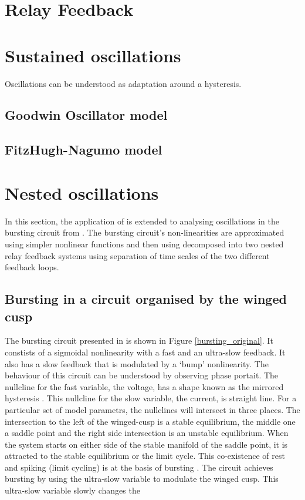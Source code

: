 \documentclass[a4paper, 12pt]{article}
\begin{document}
\section{Relay Feedback}


\section{Sustained oscillations}
Oscillations can be understood as adaptation around a hysteresis. 

\subsection{Goodwin Oscillator model}
\subsection{FitzHugh-Nagumo model}
\section{Nested oscillations}
In this section, the application of \cite{astrom1995} is extended to analysing oscillations in the bursting circuit from \cite{franci}. The bursting circuit's non-linearities are approximated using simpler nonlinear functions and then using decomposed into two nested relay feedback systems using separation of time scales of the two different feedback loops.
\subsection{Bursting in a circuit organised by the winged cusp}
The bursting circuit presented in \cite{franci} is shown in Figure \ref{bursting_original}. It constists of a sigmoidal nonlinearity with a fast and an ultra-slow feedback. It also has a slow feedback that is modulated by a `bump' nonlinearity. The behaviour of this circuit can be understood by observing phase portait. The nullcline for the fast variable, the voltage, has a shape known as the mirrored hysteresis \cite{franci2}. This nullcline for the slow variable, the current, is straight line. For a particular set of model parametrs, the nullclines will intersect in three places. The intersection to the left of the winged-cusp is a stable equilibrium, the middle one a saddle point and the right side intersection is an unstable equilibrium. When the system starts on either side of the stable manifold of the saddle point, it is attracted to the stable equilibrium or the limit cycle. This co-existence of rest and spiking (limit cycling) is at the basis of bursting \cite{franci}. 
\newline
The circuit achieves bursting by using the ultra-slow variable to modulate the winged cusp. This ultra-slow variable slowly changes the 
\end{document}
